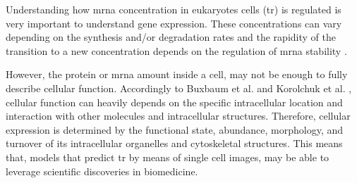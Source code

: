 Understanding how \gls{mrna} concentration in eukaryotes cells (\acrlong{tr}) is regulated is very important to understand gene expression. These concentrations can vary depending on the synthesis and/or degradation rates and the rapidity of the transition to a new concentration depends on the regulation of \gls{mrna} stability \cite{PEREZORTIN2007250}. 

However, the protein or \gls{mrna} amount inside a cell, may not be enough to fully describe cellular function. Accordingly to Buxbaum et al. \cite{Buxbaum_2014} and Korolchuk et al. \cite{Korolchuk2011}, cellular function can heavily depends on the specific intracellular location and interaction with other molecules and intracellular structures. Therefore, cellular expression is determined by the functional state, abundance, morphology, and turnover of its intracellular organelles and cytoskeletal structures. This means that, models that predict \gls{tr} by means of single cell images, may be able to leverage scientific discoveries in biomedicine.
